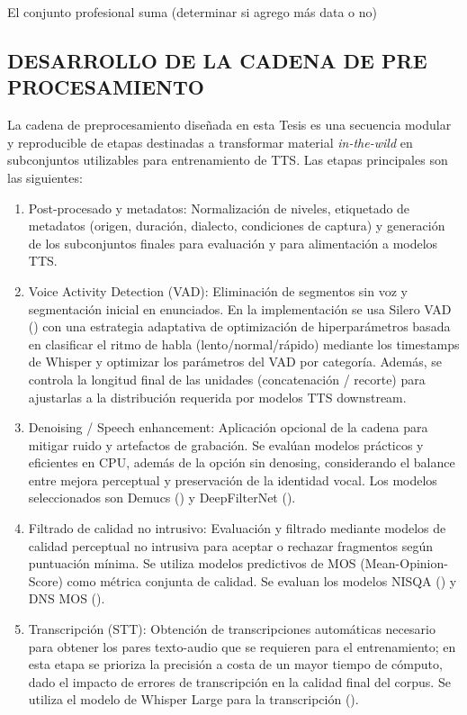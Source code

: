 El conjunto profesional suma (determinar si agrego más data o no)

\subsection{DESARROLLO DE LA CADENA DE PRE PROCESAMIENTO}

La cadena de preprocesamiento diseñada en esta Tesis es una secuencia modular y reproducible de etapas destinadas a transformar material \emph{in-the-wild} en subconjuntos utilizables para entrenamiento de TTS. Las etapas principales son las siguientes: 

\begin{enumerate}
\item Post-procesado y metadatos: Normalización de niveles, etiquetado de metadatos (origen, duración, dialecto, condiciones de captura) y generación de los subconjuntos finales para evaluación y para alimentación a modelos TTS.
\item Voice Activity Detection (VAD): Eliminación de segmentos sin voz y segmentación inicial en enunciados. En la implementación se usa Silero VAD (\cite{SileroVAD}) con una estrategia adaptativa de optimización de hiperparámetros basada en clasificar el ritmo de habla (lento/normal/rápido) mediante los timestamps de Whisper y optimizar los parámetros del VAD por categoría. Además, se controla la longitud final de las unidades (concatenación / recorte) para ajustarlas a la distribución requerida por modelos TTS downstream. 
\item Denoising / Speech enhancement: Aplicación opcional de la cadena para mitigar ruido y artefactos de grabación. Se evalúan modelos prácticos y eficientes en CPU, además de la opción sin denosing, considerando el balance entre mejora perceptual y preservación de la identidad vocal. Los modelos seleccionados son Demucs (\cite{demucs}) y DeepFilterNet (\cite{deepfilter}).
\item Filtrado de calidad no intrusivo: Evaluación y filtrado mediante modelos de calidad perceptual no intrusiva para aceptar o rechazar fragmentos según puntuación mínima. Se utiliza modelos predictivos de MOS (Mean-Opinion-Score) como métrica conjunta de calidad. Se evaluan los modelos NISQA (\cite{nisqa}) y DNS MOS (\cite{dns_mos}).
\item Transcripción (STT): Obtención de transcripciones automáticas necesario para obtener los pares texto-audio que se requieren para el entrenamiento; en esta etapa se prioriza la precisión a costa de un mayor tiempo de cómputo, dado el impacto de errores de transcripción en la calidad final del corpus. Se utiliza el modelo de Whisper Large para la transcripción (\cite{whisper}).
\end{enumerate}

